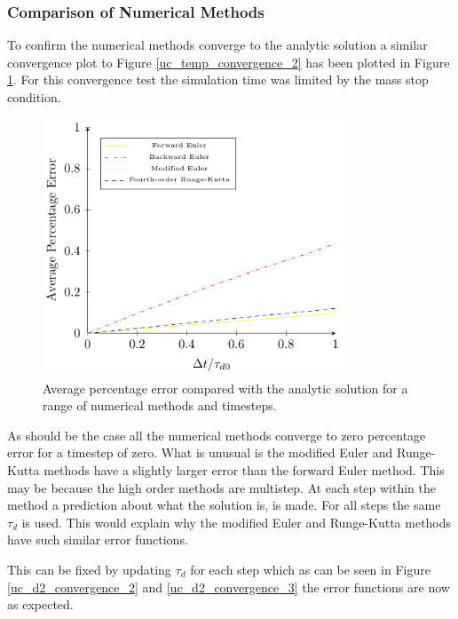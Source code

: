 \documentclass[../Interim_Report_Master]{subfiles}
\begin{document}
\subsubsection{Comparison of Numerical Methods}
To confirm the numerical methods converge to the analytic solution a similar convergence plot to Figure \ref{uc_temp_convergence_2} has been plotted in Figure \ref{uc_d2_convergence}. For this convergence test the simulation time was limited by the mass stop condition.
\begin{figure}[H]
	\centering
	\includegraphics[width=0.8\textwidth]{./Diagrams/Uncoupled_D2_Convergence/Uncoupled_D2_Convergence.pdf}
	\caption{Average percentage error compared with the analytic solution for a range of numerical methods and timesteps.}
	\label{uc_d2_convergence}
\end{figure}

As should be the case all the numerical methods converge to zero percentage error for a timestep of zero. What is unusual is the modified Euler and Runge-Kutta methods have a slightly larger error than the forward Euler method. This may be because the high order methods are multistep. At each step within the method a prediction about what the solution is, is made. For all steps the same $\tau_d$ is used. This would explain why the modified Euler and Runge-Kutta methods have such similar error functions.

This can be fixed by updating $\tau_d$ for each step which as can be seen in Figure \ref{uc_d2_convergence_2} and \ref{uc_d2_convergence_3} the error functions are now as expected.
\end{document}

